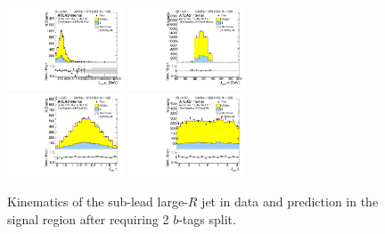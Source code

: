 \begin{figure}[htbp!]
\begin{center}
\includegraphics[width=0.31\textwidth,angle=-90]{figures/boosted/Signal/b77_TwoTag_split_Signal_sublHCand_Pt_m.pdf}
\includegraphics[width=0.31\textwidth,angle=-90]{figures/boosted/Signal/b77_TwoTag_split_Signal_sublHCand_Mass_s.pdf}\\
\includegraphics[width=0.31\textwidth,angle=-90]{figures/boosted/Signal/b77_TwoTag_split_Signal_sublHCand_Eta.pdf}
\includegraphics[width=0.31\textwidth,angle=-90]{figures/boosted/Signal/b77_TwoTag_split_Signal_sublHCand_Phi.pdf}
  \caption{Kinematics of the sub-lead large-$R$ jet in data and prediction in the signal region after requiring 2 $b$-tags split. }
  \label{fig:boosted-2bs-signal-ak10-subl}
\end{center}
\end{figure}


